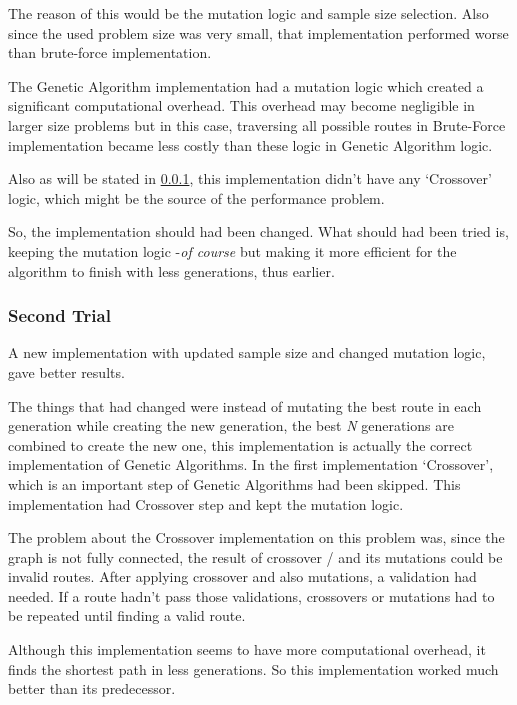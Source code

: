\documentclass[journal,transmag]{IEEEtran}
\begin{document}
    The reason of this would be the mutation logic and sample size selection.
    Also since the used problem size was very small, that implementation
    performed worse than brute-force implementation.

    The Genetic Algorithm implementation had a mutation logic which created a
    significant computational overhead. This overhead may become negligible in
    larger size problems but in this case, traversing all possible routes in
    Brute-Force implementation became less costly than these logic in Genetic
    Algorithm logic.

    Also as will be stated in \ref{second-trial}, this implementation didn't
    have any `Crossover' logic, which might be the source of the performance
    problem.

    So, the implementation should had been changed. What should had been tried is,
    keeping the mutation logic -\textit{of course} but making it more efficient
    for the algorithm to finish with less generations, thus earlier.
    \pagebreak

    \subsubsection{Second Trial} \label{second-trial}
    A new implementation with updated sample size and changed mutation logic,
    gave better results.

    The things that had changed were instead of mutating the best route in each
    generation while creating the new generation, the best \textit{N}
    generations are combined to create the new one, this implementation is
    actually the correct implementation of Genetic Algorithms. In the first
    implementation `Crossover', which is an important step of Genetic Algorithms
    had been skipped. This implementation had Crossover step and kept the
    mutation logic.

    The problem about the Crossover implementation on this problem was, since
    the graph is not fully connected, the result of crossover / and its
    mutations could be invalid routes. After applying crossover and also
    mutations, a validation had needed. If a route hadn't pass those
    validations, crossovers or mutations had to be repeated until finding a
    valid route.

    Although this implementation seems to have more computational overhead, it
    finds the shortest path in less generations. So this implementation worked
    much better than its predecessor. \\
\end{document}
